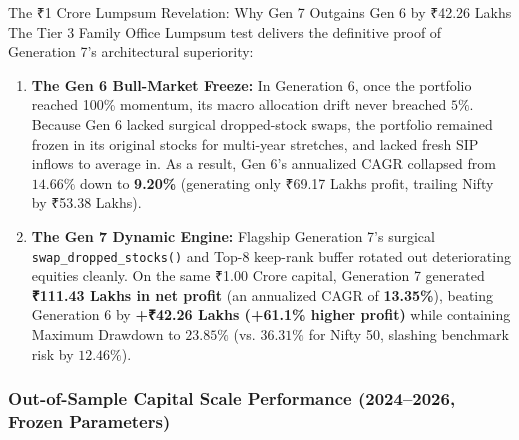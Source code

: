 \documentclass[11pt,a4paper]{article}
\begin{document}
\begin{quantbox}{The ₹1 Crore Lumpsum Revelation: Why Gen 7 Outgains Gen 6 by ₹42.26 Lakhs}
The Tier 3 Family Office Lumpsum test delivers the definitive proof of Generation 7's architectural superiority:
\begin{enumerate}[leftmargin=*]
    \item \textbf{The Gen 6 Bull-Market Freeze:} In Generation 6, once the portfolio reached 100\% momentum, its macro allocation drift never breached $5\%$. Because Gen 6 lacked surgical dropped-stock swaps, the portfolio remained frozen in its original stocks for multi-year stretches, and lacked fresh SIP inflows to average in. As a result, Gen 6's annualized CAGR collapsed from $14.66\%$ down to \textbf{9.20\%} (generating only ₹69.17 Lakhs profit, trailing Nifty by ₹53.38 Lakhs).
    \item \textbf{The Gen 7 Dynamic Engine:} Flagship Generation 7's surgical \texttt{swap\_dropped\_stocks()} and Top-8 keep-rank buffer rotated out deteriorating equities cleanly. On the same ₹1.00 Crore capital, Generation 7 generated \textbf{₹111.43 Lakhs in net profit} (an annualized CAGR of \textbf{13.35\%}), beating Generation 6 by \textbf{+₹42.26 Lakhs (+61.1\% higher profit)} while containing Maximum Drawdown to $23.85\%$ (vs. $36.31\%$ for Nifty 50, slashing benchmark risk by $12.46\%$).
\end{enumerate}
\end{quantbox}

\subsubsection{Out-of-Sample Capital Scale Performance (2024--2026, Frozen Parameters)}
\end{document}
